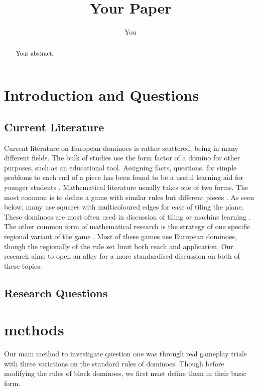 \documentclass{article}
\title{Your Paper}
\author{You}
\begin{document}
\maketitle

\begin{abstract}
Your abstract.
\end{abstract}

\section{Introduction and Questions}
\subsection{Current Literature}
Current literature on European dominoes is rather scattered, being in many different fields. The bulk of studies use the form factor of a domino for other purposes, such as an educational tool. Assigning facts, questions, for simple problems to each end of a piece has been found to be a useful learning aid for younger students \cite{education}. Mathematical literature usually takes one of two forms. The most common is to define a game with similar rules but different pieces \cite{squares}. As seen below, many use squares with multicoloured edges for ease of tiling the plane. %
These dominoes are most often used in discussion of tiling or machine learning \cite{turing}. The other common form of mathematical research is the strategy of one specific regional variant of the game \cite{regional}. Most of these games use European dominoes, though the regionally of the rule set limit both reach and application. Our research aims to open an alley for a more standardised discussion on both of these topics.

\subsection{Research Questions}


\section{methods}
Our main method to investigate question one was through real gameplay trials with three variations on the standard rules of dominoes. Though before modifying the rules of block dominoes, we first must define them in their basic form. %
\end{document}
